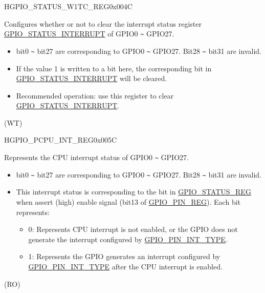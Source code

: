 \begin{register}{H}{GPIO\_STATUS\_W1TC\_REG}{0x004C}\label{regdesc:GPIOSTATUSW1TCREG}
%
\regnewline%
\begin{regdesc}\begin{reglist}
\label{fielddesc:GPIOSTATUSW1TC}\item [GPIO\_STATUS\_W1TC] Configures whether or not to clear the interrupt status register \hyperref[fielddesc:GPIOSTATUSINTERRUPT]{GPIO\_STATUS\_INTERRUPT} of GPIO0 \verb+~+ GPIO27.
\begin{itemize}
    \item bit0 \verb+~+ bit27 are corresponding to GPIO0 \verb+~+ GPIO27. Bit28 \verb+~+ bit31 are invalid.
    \item If the value 1 is written to a bit here, the corresponding bit in \hyperref[fielddesc:GPIOSTATUSINTERRUPT]{GPIO\_STATUS\_INTERRUPT} will be cleared.
    \item Recommended operation: use this register to clear \hyperref[fielddesc:GPIOSTATUSINTERRUPT]{GPIO\_STATUS\_INTERRUPT}.
\end{itemize}(WT)
\end{reglist}\end{regdesc}
\end{register}

\begin{register}{H}{GPIO\_PCPU\_INT\_REG}{0x005C}\label{regdesc:GPIOPCPUINTREG}
%
\regnewline%
\begin{regdesc}\begin{reglist}
\label{fielddesc:GPIOPROCPUINT}\item [GPIO\_PROCPU\_INT] Represents the CPU interrupt status of GPIO0 \verb+~+ GPIO27.
\begin{itemize}
    \item bit0 \verb+~+ bit27 are corresponding to GPIO0 \verb+~+ GPIO27. Bit28 \verb+~+ bit31 are invalid.
    \item This interrupt status is corresponding to the bit in \hyperref[regdesc:GPIOSTATUSREG]{GPIO\_STATUS\_REG} when assert (high) enable signal (bit13 of \hyperref[regdesc:GPIOPINNREG]{GPIO\_PIN\_REG}). Each bit represents:
    \begin{itemize}
        \item 0: Represents CPU interrupt is not enabled, or the GPIO does not generate the interrupt configured by \hyperref[fielddesc:GPIOPINNINTTYPE]{GPIO\_PIN\_INT\_TYPE}.
        \item 1: Represents the GPIO generates an interrupt configured by \hyperref[fielddesc:GPIOPINNINTTYPE]{GPIO\_PIN\_INT\_TYPE} after the CPU interrupt is enabled.
    \end{itemize}
\end{itemize}
(RO)
\end{reglist}\end{regdesc}
\end{register}





